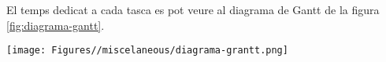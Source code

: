 El temps dedicat a cada tasca es pot veure al diagrama de Gantt de la figura \ref{fig:diagrama-gantt}.

\begin{sidewaysfigure}
    \centering
    \texttt{[image: Figures//miscelaneous/diagrama-grantt.png]}
    \caption{Diagrama de Gantt del desenvolupament del projecte}
    \label{fig:diagrama-gantt}
\end{sidewaysfigure}
